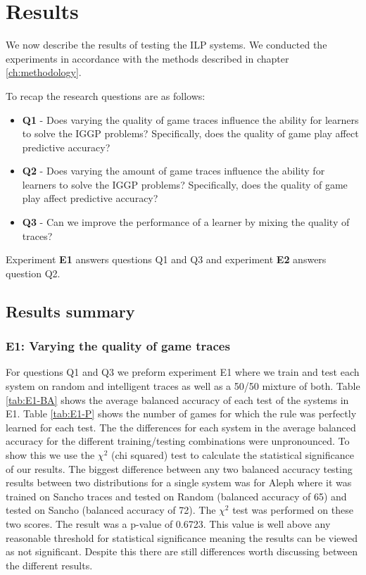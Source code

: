 \chapter{Results}\label{ch:results}
We now describe the results of testing the ILP systems. We conducted the experiments in accordance with the methods described in chapter \ref{ch:methodology}.

To recap the research questions are as follows:
\begin{itemize}
	\item \textbf{Q1} - Does varying the quality of game traces influence the ability for learners to solve the IGGP problems? Specifically, does the quality of game play affect predictive accuracy?
	\item \textbf{Q2} - Does varying the amount of game traces influence the ability for learners to solve the IGGP problems? Specifically, does the quality of game play affect predictive accuracy?
	\item \textbf{Q3} - Can we improve the performance of a learner by mixing the quality of traces?
\end{itemize}

Experiment \textbf{E1} answers questions Q1 and Q3 and experiment \textbf{E2} answers question Q2.

\section{Results summary}



\subsection{E1: Varying the quality of game traces}
For questions Q1 and Q3 we preform experiment E1 where we train and test each system on random and intelligent traces as well as a 50/50 mixture of both. Table \ref{tab:E1-BA} shows the average balanced accuracy of each test of the systems in E1. Table \ref{tab:E1-P} shows the number of games for which the rule was perfectly learned for each test. The the differences for each system in the average balanced accuracy for the different training/testing combinations were unpronounced. To show this we use the $\chi^2$ (chi squared) test to calculate the statistical significance of our results. The biggest difference between any two balanced accuracy testing results between two distributions for a single system was for Aleph where it was trained on Sancho traces and tested on Random (balanced accuracy of 65) and tested on Sancho (balanced accuracy of 72). The $\chi^2$ test was performed on these two scores. The result was a p-value of 0.6723. This value is well above any reasonable threshold for statistical significance meaning the results can be viewed as not significant. Despite this there are still differences worth discussing between the different results.

